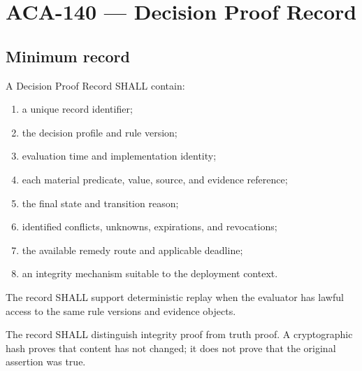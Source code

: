 \chapter{ACA-140 --- Decision Proof Record}
\section{Minimum record}
A Decision Proof Record SHALL contain:
\begin{enumerate}
\item a unique record identifier;
\item the decision profile and rule version;
\item evaluation time and implementation identity;
\item each material predicate, value, source, and evidence reference;
\item the final state and transition reason;
\item identified conflicts, unknowns, expirations, and revocations;
\item the available remedy route and applicable deadline;
\item an integrity mechanism suitable to the deployment context.
\end{enumerate}

\begin{requirement}[ACA-140-001]
The record SHALL support deterministic replay when the evaluator has lawful access to the same rule versions and evidence objects.
\end{requirement}
\begin{requirement}[ACA-140-002]
The record SHALL distinguish integrity proof from truth proof. A cryptographic hash proves that content has not changed; it does not prove that the original assertion was true.
\end{requirement}
